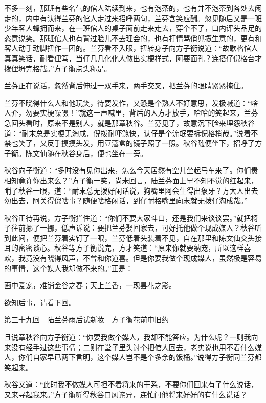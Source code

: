 \documentclass[12pt,UTF8]{ctexbook}
\begin{document}
{{{不多一刻，那班有些名气的倌人陆续到来，也有泡茶的，也有并不泡茶到各处去闲走的，内中有认得兰芬的倌人走过来招呼两句，兰芬含笑应酬。忽见随后又是一班少年客人蜂拥而来，在一班倌人的桌子面前走来走去，穿个不了，口内评头品足的恣意说笑。那班倌人也有背过脸儿不去理会的，也有打情骂俏兜揽生意的，更有和客人动手动脚扭作一团的。兰芬看不入眼，扭转身子向方子衡说道：“故歇格倌人真真笑话，耐看俚笃，当仔几几化化人做出实梗样式，阿要面孔？连搭仔倪格台才拨俚坍完格哉。”方子衡点头称是。

兰芬正在说话，忽然背后伸过一双手来，两手交叉，把兰芬的眼睛紧紧掩住。

兰芬不晓得什么人和他玩笑，待要发作，又恐是个熟人不好意思，发极喊道：“啥人介，勿要实梗噪嗫！”就这一声喊里，背后的人方才放手，哈哈的笑起来，兰芬急回头看时，原来不是别人，就是那章秋谷。兰芬见了，故意沉下脸来埋怨秋谷道：“耐末总是实梗无淘成，倪拨耐吓煞快，认仔是个流氓要拆倪格梢哉。”说着不禁也笑了，又反手摸摸头发，用豆蔻盒的镜子照了一照。秋谷随便坐下，招呼了方子衡。陈文仙随在秋谷身后，便也坐在一旁。

秋谷向子衡道：“多时没有见你出来，怎么今天居然有空儿坐起马车来了。你们贵相知竟许你出来么？”方子衡一笑，尚未回言，陆兰芬面上早不知不觉的红起来，睄了秋谷一眼，道：“耐末总无拨好闲话说，狗嘴里阿会生得出象牙？方大人出去勿出去，阿关得倪啥事？随便啥格闲话，到仔耐格嘴里向末就无拨仔淘成哉。”

秋谷正待再说，方子衡拦住道：“你们不要大家斗口，还是我们来谈谈罢。”就把椅子往前挪了一挪，低声诉说：要把兰芬娶回家去，可好托他做个现成媒人？秋谷听到此间，便把兰芬着实钉了一眼，兰芬低着头装着不见，自在那里和陈文仙交头接耳的密密谈心。秋谷等方子衡说完，方才笑道：“原来你就要纳宠，所以这样喜欢，我竟没有晓得风声，不曾和你道喜。但是你要我做个现成媒人，虽然极是容易的事情，这个媒人我却做不来的。”正是：

画中爱宠，难销金谷之春；天上兰香，一现昙花之影。

欲知后事，请看下回。





第三十九回　陆兰芬雨后试新妆　方子衡花前申旧约





且说章秋谷向方子衡道：“你要我做个媒人，我却不能答应。为什么呢？一则我向来没有经手过这些事情；二则在堂子里头讨个把倌人回去，老实说也用不着什么媒人，你们自家早已两下言明，这个媒人岂不是个多余的饭桶。”说得方子衡同兰芬都笑起来。

秋谷又道：“此时我不做媒人可担不着将来的干系，不要你们回来有了什么说话，又来寻起我来。”方子衡听得秋谷口风诧异，连忙问他将来好好的有什么说话？

}}}
\end{document}
